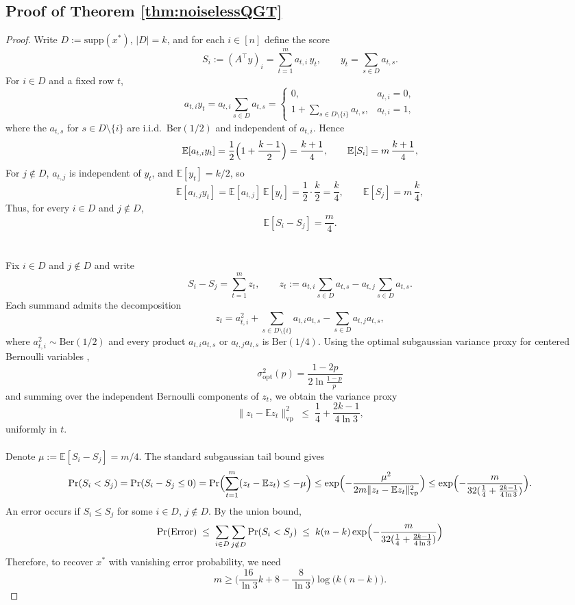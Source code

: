 \documentclass{article}
\newcommand{\Ber}{\mathrm{Ber}}
\newcommand{\supp}{\mathrm{supp}}
\begin{document}
\subsection{Proof of Theorem \ref{thm:noiselessQGT}}
\begin{proof}
Write $D := \supp(x^*)$, $|D|=k$, and for each $i\in[n]$ define the score
\[
S_i := (A^\top y)_i
= \sum_{t=1}^m a_{t,i}\,y_t,
\qquad
y_t = \sum_{s\in D} a_{t,s}.
\]
For $i\in D$ and a fixed row $t$,
\[
a_{t,i} y_t
= a_{t,i}\sum_{s\in D} a_{t,s}
=
\begin{cases}
0, & a_{t,i}=0,\\[3pt]
1 + \sum_{s\in D\setminus\{i\}} a_{t,s}, & a_{t,i}=1,
\end{cases}
\]
where the $a_{t,s}$ for $s\in D\setminus\{i\}$ are i.i.d.\ $\Ber(1/2)$ and
independent of $a_{t,i}$. Hence
\[
\mathbb{E}[a_{t,i}y_t]
= \frac12\Bigl(1 + \frac{k-1}{2}\Bigr)
= \frac{k+1}{4},
\qquad
\mathbb{E}[S_i] = m\,\frac{k+1}{4},
\]
For $j\notin D$, $a_{t,j}$ is independent of $y_t$, and
$\mathbb{E}[y_t] = k/2$, so
\[
\mathbb{E}[a_{t,j}y_t]
= \mathbb{E}[a_{t,j}]\,\mathbb{E}[y_t]
= \frac12\cdot\frac{k}{2}
= \frac{k}{4},
\qquad
\mathbb{E}[S_j] = m\,\frac{k}{4},
\]
Thus, for every $i\in D$ and $j\notin D$,
\[
\mathbb{E}[S_i - S_j] = \frac{m}{4}.
\]
\\\\
Fix $i\in D$ and $j\notin D$ and write
\[
S_i - S_j = \sum_{t=1}^m z_t,
\qquad
z_t := a_{t,i}\sum_{s\in D} a_{t,s}
      - a_{t,j}\sum_{s\in D} a_{t,s}.
\]
Each summand admits the decomposition
\[
z_t 
= a_{t,i}^2 
  + \sum_{s\in D\setminus\{i\}} a_{t,i}a_{t,s}
  - \sum_{s\in D} a_{t,j}a_{t,s},
\]
where $a_{t,i}^2\sim\Ber(1/2)$ and every product $a_{t,i}a_{t,s}$ or
$a_{t,j}a_{t,s}$ is $\Ber(1/4)$.
Using the optimal subgaussian variance proxy for centered Bernoulli
variables ,
\[
\sigma^2_{\mathrm{opt}}(p)
=\frac{1-2p}{2\ln\frac{1-p}{p}}
\]
and summing over the independent Bernoulli components of $z_t$, we obtain the variance proxy
\[
\|z_t - \mathbb{E}z_t\|^2_\text{vp}
\;\le\;
\frac14 + \frac{2k-1}{4\ln 3},
\]
uniformly in $t$.
\\\\
Denote $\mu := \mathbb{E}[S_i - S_j] = m/4$.
The standard subgaussian tail bound gives
\[
\Pr(S_i < S_j)
= \Pr(S_i - S_j \le 0)
= \Pr\Bigl(\sum_{t=1}^m (z_t - \mathbb{E}z_t) \le -\mu\Bigr)
\le 
\exp\Bigl(
  - \frac{\mu^2}{2 m \|z_t - \mathbb{E}z_t\|^2_\text{vp}}
\Bigr)
\le
\exp\Bigl(
  - \frac{m}{32 (\frac14 + \frac{2k-1}{4\ln3})}
\Bigr).
\]
An error occurs if $S_i \le S_j$ for some $i\in D$, $j\notin D$.  
By the union bound,
\[
\Pr(\text{Error})
\;\le\;
\sum_{i\in D}\sum_{j\notin D} \Pr(S_i < S_j)
\;\le\;
k(n-k)
\exp\Bigl(
  - \frac{m}{32 (\frac14 + \frac{2k-1}{4\ln3})}
\Bigr)
\]
Therefore, to recover $x^*$ with vanishing error probability, we need 
\[
m\ge \bigl(\frac{16}{\ln3}k+8-\frac{8}{\ln3}\bigr)\log\bigl(k(n-k)\bigr).
\]
\end{proof}
\end{document}

